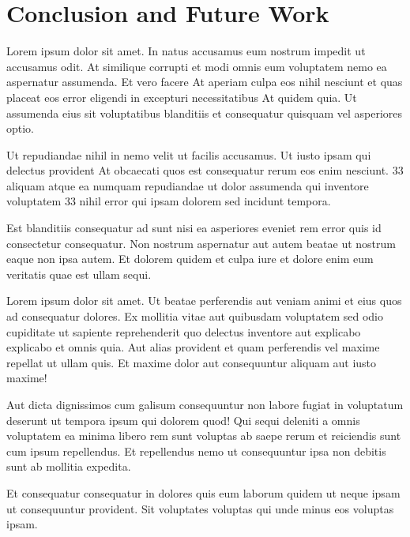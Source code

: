 \chapter{Conclusion and Future Work}
\label{c:concl}



Lorem ipsum dolor sit amet. In natus accusamus eum nostrum impedit ut accusamus odit. At similique corrupti et modi omnis eum voluptatem nemo ea aspernatur assumenda. Et vero facere At aperiam culpa eos nihil nesciunt et quas placeat eos error eligendi in excepturi necessitatibus At quidem quia. Ut assumenda eius sit voluptatibus blanditiis et consequatur quisquam vel asperiores optio.

Ut repudiandae nihil in nemo velit ut facilis accusamus. Ut iusto ipsam qui delectus provident At obcaecati quos est consequatur rerum eos enim nesciunt. 33 aliquam atque ea numquam repudiandae ut dolor assumenda qui inventore voluptatem 33 nihil error qui ipsam dolorem sed incidunt tempora.

Est blanditiis consequatur ad sunt nisi ea asperiores eveniet rem error quis id consectetur consequatur. Non nostrum aspernatur aut autem beatae ut nostrum eaque non ipsa autem. Et dolorem quidem et culpa iure et dolore enim eum veritatis quae est ullam sequi.



Lorem ipsum dolor sit amet. Ut beatae perferendis aut veniam animi et eius quos ad consequatur dolores. Ex mollitia vitae aut quibusdam voluptatem sed odio cupiditate ut sapiente reprehenderit quo delectus inventore aut explicabo explicabo et omnis quia. Aut alias provident et quam perferendis vel maxime repellat ut ullam quis. Et maxime dolor aut consequuntur aliquam aut iusto maxime!

Aut dicta dignissimos cum galisum consequuntur non labore fugiat in voluptatum deserunt ut tempora ipsum qui dolorem quod! Qui sequi deleniti a omnis voluptatem ea minima libero rem sunt voluptas ab saepe rerum et reiciendis sunt cum ipsum repellendus. Et repellendus nemo ut consequuntur ipsa non debitis sunt ab mollitia expedita.

Et consequatur consequatur in dolores quis eum laborum quidem ut neque ipsam ut consequuntur provident. Sit voluptates voluptas qui unde minus eos voluptas ipsam.


